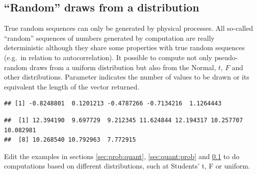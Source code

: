 \documentclass[krantz2]{krantz}\usepackage{knitr}%
\begin{document}
\subsection{``Random'' draws from a distribution}\label{sec:stat:random}

True random sequences can only be generated by physical processes. All so-called ``random'' sequences of numbers generated by computation are really deterministic although they share some properties with true random sequences (e.g.\ in relation to autocorrelation). It possible to compute not only pseudo-random draws from a uniform distribution but also from the Normal, $t$, $F$ and other distributions. Parameter  indicates the number of values to be drawn or its equivalent the length of the vector returned.

\begin{knitrout}\footnotesize
{}\color{fgcolor}\begin{kframe}
\begin{alltt}
\hlstd{(}\hlstd{)}
\end{alltt}
\begin{verbatim}
## [1] -0.8248801  0.1201213 -0.4787266 -0.7134216  1.1264443
\end{verbatim}
\begin{alltt}
\hlstd{(} \hlstd{=} \hlstd{,}  \hlstd{=} \hlstd{,}  \hlstd{=} \hlstd{)}
\end{alltt}
\begin{verbatim}
##  [1] 12.394190  9.697729  9.212345 11.624844 12.194317 10.257707 10.082981
##  [8] 10.268540 10.792963  7.772915
\end{verbatim}
\end{kframe}
\end{knitrout}

\begin{playground}
Edit the examples in sections \ref{sec:prob:quant}, \ref{sec:quant:prob} and \ref{sec:stat:random} to do computations based on different distributions, such at Students' t, F or uniform.
\end{playground}
\end{document}
